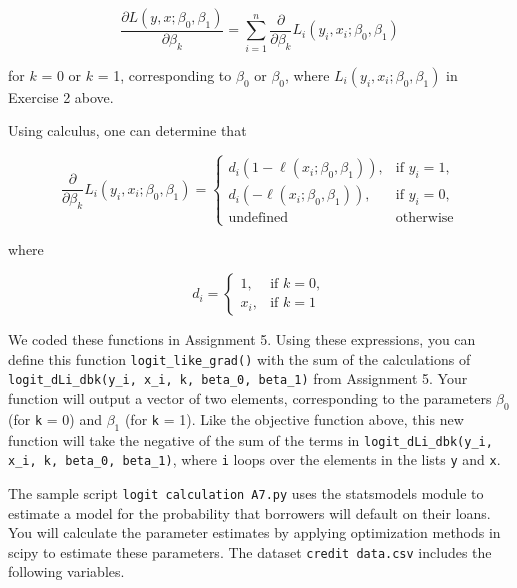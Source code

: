 \documentclass[11pt]{exam}
\begin{document}
\begin{questions}
\begin{parts}
$$\frac{\partial  L(y, x;\beta_{0},\beta_{1})}{\partial \beta_{k}} = \sum_{i=1}^{n} \frac{\partial}{\partial \beta_{k}} L_{i}(y_{i},x_{i};\beta_{0},\beta_{1}) $$

for $k$ = 0 or $k$ = 1, corresponding to $\beta_{0}$ or $\beta_{0}$, where $L_{i}(y_{i},x_{i};\beta_{0},\beta_{1})$ in Exercise 2 above.

Using calculus, one can determine that

\begin{equation*}
\frac{\partial}{\partial \beta_{k}} L_{i}(y_{i},x_{i};\beta_{0},\beta_{1}) = 
\begin{cases}
    d_{i}(1-\ell(x_{i};\beta_{0},\beta_{1})), & \text{if } y_{i} = 1,\\ 
    d_{i}(-\ell(x_{i};\beta_{0},\beta_{1})), & \text{if } y_{i} = 0,\\
    \text{undefined} & \text{otherwise}
\end{cases}
\end{equation*}

where 

$$d_{i} = \begin{cases}
1, & \text{if } k = 0,\\
x_{i}, & \text{if } k = 1
\end{cases}$$


We coded these functions in Assignment 5. Using these expressions, you can define this
function \texttt{logit\_like\_grad()} with the sum of the calculations of \texttt{logit\_dLi\_dbk(y\_i, x\_i,
k, beta\_0, beta\_1)} from Assignment 5. Your function will output a vector of two elements, corresponding to the parameters $\beta_{0}$ (for \texttt{k} = 0) and $\beta_{1}$ (for \texttt{k} = 1). Like the objective function
above, this new function will take the negative of the sum of the terms in \texttt{logit\_dLi\_dbk(y\_i,
x\_i, k, beta\_0, beta\_1)}, where \texttt{i} loops over the elements in the lists \texttt{y} and \texttt{x}.

        \end{parts}

\question The sample script \texttt{logit calculation A7.py} uses the statsmodels module to estimate a model for the probability that borrowers will default on their loans. You will calculate the parameter estimates by applying optimization methods in scipy to estimate these parameters. The dataset \texttt{credit data.csv} includes the following variables.


\end{questions}
\end{document}
